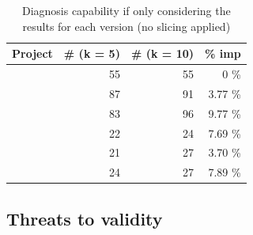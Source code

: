 \documentclass{article}
\begin{document}
\begin{table}[h]
	\centering
	\setlength{\tabcolsep}{4pt}
	  \begin{tabular}{lrrr}
		\toprule
		Project            & \# (k = 5) & \# (k = 10) &  \% imp   \\ %
		\midrule
		\lang{}            & 55 & 55 & 0 \%       \\   %
		\cmath{}           & 87  & 91 & 3.77 \%     \\   %
		\closure{}         & 83  & 96  & 9.77 \%     \\   %
		\chart{}           & 22  & 24 & 7.69 \%      \\  %
		\jtime{}           & 21  & 27 & 3.70 \%       \\   %
		\mockito{}         & 24  & 27 & 7.89 \%    \\     %
		\bottomrule
	\end{tabular}
  \caption {Diagnosis capability if only considering the \sfl{} results for each version (no slicing applied)}
  \label{table:fs}
  \end{table}
  \normalsize


\subsection{Threats to validity}

\end{document}
